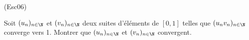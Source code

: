 \begin{tiny}(Esc06)\end{tiny} Soit $(u_{n})_{n\in \N}$ et $(v_{n})_{n\in \N}$ deux
suites d'{\'e}l{\'e}ments de $\left[ 0,1\right] $ telles que $%
(u_{n}v_{n})_{n\in \N}$ converge vers 1. Montrer que
$(u_{n})_{n\in \N}$ et $(v_{n})_{n\in \N}$ convergent.
